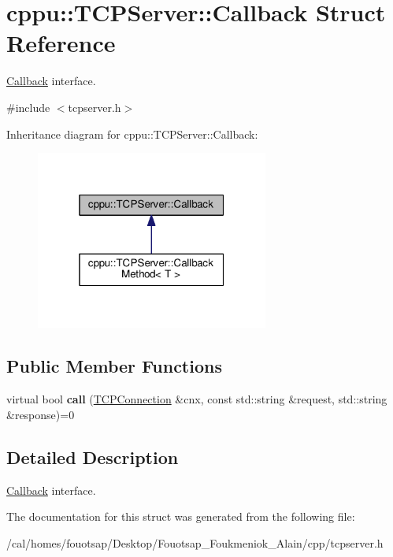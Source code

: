 \hypertarget{structcppu_1_1_t_c_p_server_1_1_callback}{\section{cppu\+:\+:T\+C\+P\+Server\+:\+:Callback Struct Reference}
\label{structcppu_1_1_t_c_p_server_1_1_callback}
}


\hyperlink{structcppu_1_1_t_c_p_server_1_1_callback}{Callback} interface.  




{\ttfamily \#include $<$tcpserver.\+h$>$}



Inheritance diagram for cppu\+:\+:T\+C\+P\+Server\+:\+:Callback\+:
\nopagebreak
\begin{figure}[H]
\begin{center}
\leavevmode
\includegraphics[width=217pt]{structcppu_1_1_t_c_p_server_1_1_callback__inherit__graph}
\end{center}
\end{figure}
\subsection*{Public Member Functions}
\begin{DoxyCompactItemize}
\item 
\hypertarget{structcppu_1_1_t_c_p_server_1_1_callback_aabe4b0b30e14ddeb7c0c02aa3a335eba}{virtual bool {\bfseries call} (\hyperlink{classcppu_1_1_t_c_p_connection}{T\+C\+P\+Connection} \&cnx, const std\+::string \&request, std\+::string \&response)=0}\label{structcppu_1_1_t_c_p_server_1_1_callback_aabe4b0b30e14ddeb7c0c02aa3a335eba}

\end{DoxyCompactItemize}


\subsection{Detailed Description}
\hyperlink{structcppu_1_1_t_c_p_server_1_1_callback}{Callback} interface. 

The documentation for this struct was generated from the following file\+:\begin{DoxyCompactItemize}
\item 
/cal/homes/fouotsap/\+Desktop/\+Fouotsap\+\_\+\+Foukmeniok\+\_\+\+Alain/cpp/tcpserver.\+h\end{DoxyCompactItemize}
